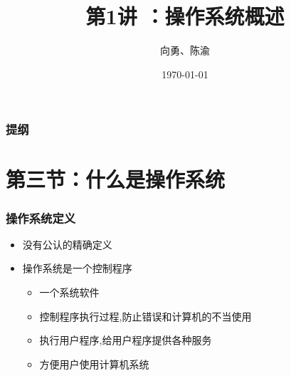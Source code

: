\documentclass[UTF8]{ctexbeamer}
\title[第1讲]{第1讲 ：操作系统概述} %
\author{向勇、陈渝} %
\institute[清华大学] %
{
清华大学计算机系 \\ %
\medskip
\textit{xyong,yuchen@tsinghua.edu.cn} %
}
\date{\today} %
\begin{document}
\begin{frame}
\titlepage %
\end{frame}

\begin{frame}
\frametitle{提纲} %
\tableofcontents %
\end{frame}


\section{第三节：什么是操作系统} %

\begin{frame}

\frametitle{操作系统定义}

\begin{itemize}
\item 没有公认的精确定义
\item 操作系统是一个控制程序
	\begin{itemize}
	\item 一个系统软件
	\item 控制程序执行过程,防止错误和计算机的不当使用
	\item 执行用户程序,给用户程序提供各种服务
	\item 方便用户使用计算机系统
	\end{itemize}
\end{itemize}

\end{frame}
\end{document}
